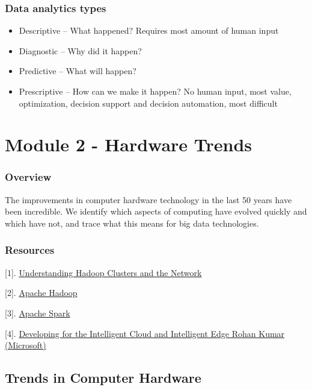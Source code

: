 \documentclass[
]{book}
\providecommand{\tightlist}{%
  \setlength{\itemsep}{0pt}\setlength{\parskip}{0pt}}
\begin{document}
\subsection{Data analytics types}\label{data-analytics-types}

\begin{itemize}
\tightlist
\item
  Descriptive -- What happened? Requires most amount of human input
\item
  Diagnostic -- Why did it happen?
\item
  Predictive -- What will happen?
\item
  Prescriptive -- How can we make it happen? No human input, most value, optimization, decision support and decision automation, most difficult
\end{itemize}

\chapter{Module 2 - Hardware Trends}\label{module-2---hardware-trends}

\subsection{Overview}\label{overview-1}

The improvements in computer hardware technology in the last 50 years have been incredible.
We identify which aspects of computing have evolved quickly and which have not, and trace what this means for big data technologies.

\subsection{Resources}\label{resources-1}

{[}1{]}. \href{https://bradhedlund.com/2011/09/10/understanding-hadoop-clusters-and-the-network/}{Understanding Hadoop Clusters and the Network}

{[}2{]}. \href{https://hadoop.apache.org/}{Apache Hadoop}

{[}3{]}. \href{https://spark.apache.org/}{Apache Spark}

{[}4{]}. \href{https://vimeo.com/274266764}{Developing for the Intelligent Cloud and Intelligent Edge Rohan Kumar (Microsoft)}

\section{Trends in Computer Hardware}\label{trends-in-computer-hardware}
\end{document}
